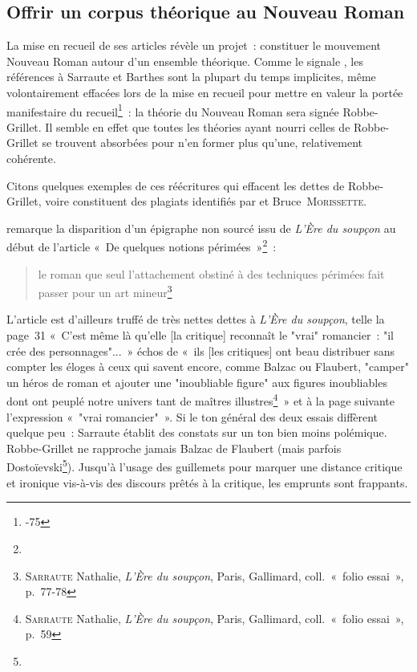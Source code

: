 \documentclass[12pt, a4paper]{article}
\begin{document}
    


\subsection{Offrir un corpus théorique au Nouveau Roman}

La mise en recueil de ses articles révèle un projet~: constituer le mouvement Nouveau Roman autour d'un ensemble théorique. Comme le signale \galia, les références à Sarraute et Barthes sont la plupart du temps implicites, même volontairement effacées lors de la mise en recueil pour mettre en valeur la portée manifestaire du recueil\footnote{-75}~: la théorie du Nouveau Roman sera signée Robbe-Grillet. Il semble en effet que toutes les théories ayant nourri celles de Robbe-Grillet se trouvent absorbées pour n'en former plus qu'une, relativement cohérente.

Citons quelques exemples de ces réécritures qui effacent les dettes de Robbe-Grillet, voire constituent des plagiats identifiés par \galia{} et Bruce~\textsc{Morissette}.



\galia{} remarque la disparition d'un épigraphe non sourcé issu de \textit{L'Ère du soupçon} au début de l'article «~De quelques notions périmées~»\footnote{}~:
\begin{quote}
    le roman que seul l'attachement obstiné à des techniques périmées fait passer pour un art mineur\footnote{\textsc{Sarraute} Nathalie, \textit{L'Ère du soupçon}, Paris, Gallimard, coll.~«~folio essai~», p.~77-78}
\end{quote}

L'article est d'ailleurs truffé de très nettes dettes à \textit{L'Ère du soupçon}, telle la page~31 «~C’est même là qu’elle [la critique] reconnaît le "vrai" romancier~: "il crée des personnages"...~» échos de «~ils [les critiques] ont beau distribuer sans compter les éloges à ceux qui savent encore, comme Balzac ou Flaubert, "camper" un héros de roman et ajouter une "inoubliable figure" aux figures inoubliables dont ont peuplé notre univers tant de maîtres illustres\footnote{\textsc{Sarraute} Nathalie, \textit{L'Ère du soupçon}, Paris, Gallimard, coll.~«~folio essai~», p.~59}~» et à la page suivante l'expression «~"vrai romancier"~». Si le ton général des deux essais diffèrent quelque peu~: Sarraute établit des constats sur un ton bien moins polémique. Robbe-Grillet ne rapproche jamais Balzac de Flaubert (mais parfois Dostoïevski\footnote{}). Jusqu'à l'usage des guillemets pour marquer une distance critique et ironique vis-à-vis des discours prêtés à la critique, les emprunts sont frappants. 
\end{document}
